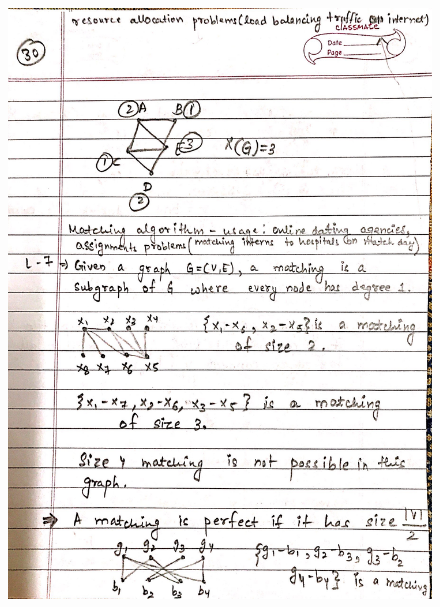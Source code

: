 \begin{figure}[H]
    \centering
    \includegraphics[scale=0.25]{"./MIT-6.042J/MIT-6042J-030"}
\end{figure}
\newpage
